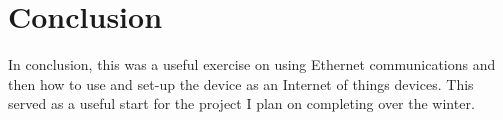\documentclass[a4paper,12pt]{scrartcl}
\begin{document}
	\section{Conclusion}
	{
		In conclusion, this was a useful exercise on using Ethernet communications and then how to use and set-up the device as an Internet of things devices. This served as a useful start for the project I plan on completing over the winter.
	}
	
	\newpage
	
	\printbibliography[heading=bibintoc,title=References]
\end{document}
